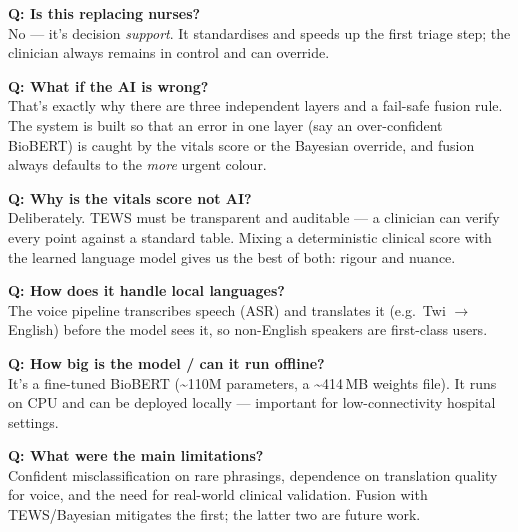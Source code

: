 \documentclass[11pt]{article}
\begin{document}
\begin{qabox}
\textbf{Q: Is this replacing nurses?} \\
No --- it's decision \emph{support}. It standardises and speeds up the first triage step; the clinician
always remains in control and can override.

\medskip
\textbf{Q: What if the AI is wrong?} \\
That's exactly why there are three independent layers and a fail-safe fusion rule. The system is built so
that an error in one layer (say an over-confident BioBERT) is caught by the vitals score or the Bayesian
override, and fusion always defaults to the \emph{more} urgent colour.

\medskip
\textbf{Q: Why is the vitals score not AI?} \\
Deliberately. TEWS must be transparent and auditable --- a clinician can verify every point against a
standard table. Mixing a deterministic clinical score with the learned language model gives us the best of
both: rigour and nuance.

\medskip
\textbf{Q: How does it handle local languages?} \\
The voice pipeline transcribes speech (ASR) and translates it (e.g.\ Twi $\rightarrow$ English) before the
model sees it, so non-English speakers are first-class users.

\medskip
\textbf{Q: How big is the model / can it run offline?} \\
It's a fine-tuned BioBERT (\textasciitilde110M parameters, a \textasciitilde414\,MB weights file). It runs
on CPU and can be deployed locally --- important for low-connectivity hospital settings.

\medskip
\textbf{Q: What were the main limitations?} \\
Confident misclassification on rare phrasings, dependence on translation quality for voice, and the need
for real-world clinical validation. Fusion with TEWS/Bayesian mitigates the first; the latter two are
future work.
\end{qabox}
\end{document}
